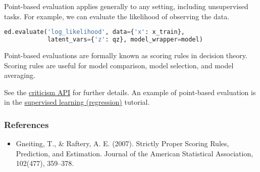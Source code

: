 Point-based evaluation applies generally to any setting, including
unsupervised tasks. For example, we can evaluate the likelihood of
observing the data.
\begin{lstlisting}[language=Python]
ed.evaluate('log_likelihood', data={'x': x_train},
            latent_vars={'z': qz}, model_wrapper=model)
\end{lstlisting}

Point-based evaluations are formally known as scoring rules
in decision theory. Scoring rules are useful for model comparison, model
selection, and model averaging.

See the \href{api/criticisms}{criticism API} for further details.
An example of point-based evaluation is in the
\href{tut_supervised_regression}{supervised learning
(regression)} tutorial.

\subsubsection{References}\label{references}

\begin{itemize}
\item
  Gneiting, T., & Raftery, A. E. (2007). Strictly Proper Scoring
  Rules, Prediction, and Estimation. Journal of the American
  Statistical Association, 102(477), 359–378.
\end{itemize}
